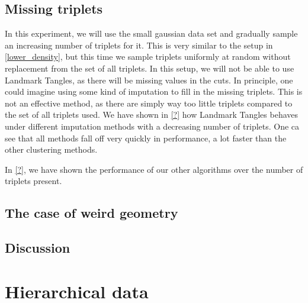 \subsection{Missing triplets}
In this experiment, we will use the small gaussian data set and gradually sample an increasing number of triplets for it. 
This is very similar to the setup in \autoref{lower_density}, but this time we sample triplets uniformly at random without replacement
from the set of all triplets. In this setup, we will not be able to use Landmark Tangles, as there will be missing values in the cuts. 
In principle, one could imagine using some kind of imputation to fill in the missing triplets. This is not an effective method,
as there are simply way too little triplets compared to the set of all triplets used. We have shown in \autoref{?} 
how Landmark Tangles behaves under different imputation methods with a decreasing number of triplets. One ca see that all methods fall 
off very quickly in performance, a lot faster than the other clustering methods.

In \autoref{?}, we have shown the performance of our other algorithms over the number of triplets present.


\subsection{The case of weird geometry}

\subsection{Discussion}

\section{Hierarchical data}\label{sec:hierarchical_data}

